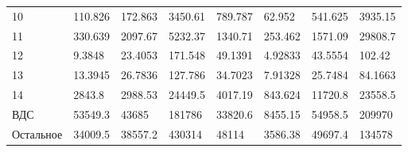 \documentclass[12pt, a4paper]{article}
\begin{document}
\begin{tabular}{|l|lllllll}
10     &                                            110.826 &                    172.863 &                     3450.61 &                                            789.787 &                                             62.952 &        541.625 &                                            3935.15\\
11 &                                            330.639 &                    2097.67 &                     5232.37 &                                            1340.71 &                                            253.462 &        1571.09 &                                            29808.7  \\
12                              &                                             9.3848 &                    23.4053 &                     171.548 &                                            49.1391 &                                            4.92833 &        43.5554 &                                             102.42 \\
13 &                                            13.3945 &                    26.7836 &                     127.786 &                                            34.7023 &                                            7.91328 &        25.7484 &                                            84.1663 \\
14                          &                                             2843.8 &                    2988.53 &                     24449.5 &                                            4017.19 &                                            843.624 &        11720.8 &                                            23558.5  \\
ВДС                                                &                                            53549.3 &                      43685 &                      181786 &                                            33820.6 &                                            8455.15 &        54958.5 &                                             209970 \\
Остальное                                          &                                            34009.5 &                    38557.2 &                      430314 &                                              48114 &                                            3586.38 &        49697.4 &                                             134578 \\
\hline
\end{tabular}
\end{document}
